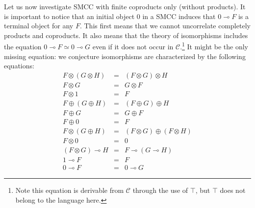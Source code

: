 \documentclass{lmcs}
\newcommand*{\tens}{\otimes} %
\newcommand*{\lolipop}{\multimap} %
\newcommand*{\iso}{\mathrel{\simeq}} %
\newcommand*{\thCP}{\mathcal{C}}
\begin{document}
Let us now investigate SMCC with finite coproducts only (without products).
It is important to notice that an initial object $0$ in a SMCC induces that $0\lolipop F$ is a terminal object for any $F$.
This first means that we cannot uncorrelate completely products and coproducts.
It also means that the theory of isomorphisms includes the equation $0\lolipop F\iso 0\lolipop G$ even if it does not occur in $\thCP$.\footnote{Note this equation is derivable from $\thCP$ through the use of $\top$, but $\top$ does not belong to the language here.}
It might be the only missing equation: we conjecture isomorphisms are characterized by the following equations:
\begin{equation*}
\begin{array}{rcl}
  F\tens(G\tens H) & = & (F\tens G)\tens H \\
  F\tens G & = & G\tens F \\
  F\tens 1 & = & F \\
  F\oplus (G\oplus H) &=& (F\oplus G)\oplus H \\
  F\oplus G &=& G\oplus F \\
  F\oplus 0 &=& F \\
  F\tens(G\oplus H) &=& (F\tens G)\oplus(F\tens H) \\
  F\tens 0 &=& 0 \\
  (F\tens G)\lolipop H & = & F\lolipop (G\lolipop H) \\
  1 \lolipop F & = & F \\
  0\lolipop F & = & 0\lolipop G
\end{array}
\end{equation*}
\end{document}
